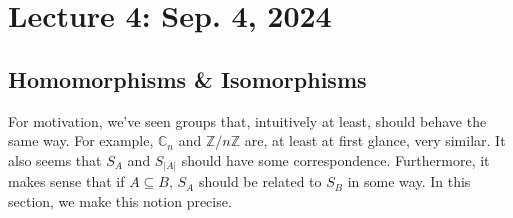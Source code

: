 \pagebreak

\section{Lecture 4: Sep. 4, 2024}

    \subsection{Homomorphisms \& Isomorphisms}

        For motivation, we've seen groups that, intuitively at least, should behave the same way. For example, \(\mathbb{C}_n\) and \(\mathbb{Z}/n\mathbb{Z}\) are, at least at first glance, very similar. It also seems that \(S_A\) and \(S_{|A|}\) should have some correspondence.  Furthermore, it makes sense that if \(A\subseteq B\), \(S_A\) should be related to \(S_B\) in some way. In this section, we make this notion precise.

